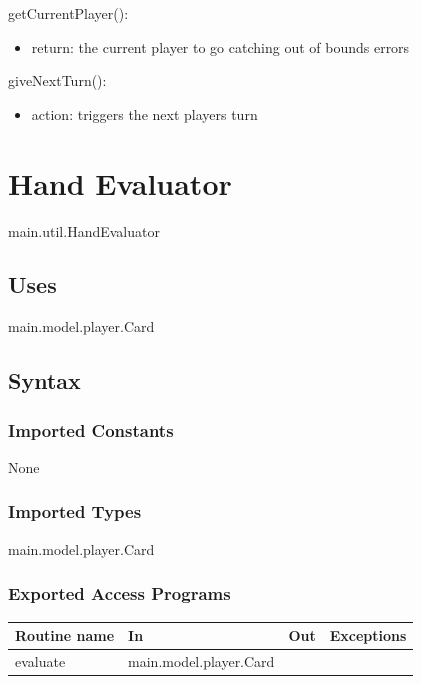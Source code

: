 \documentclass[12pt, titlepage]{article}
\begin{document}
\noindent getCurrentPlayer():
\begin{itemize}
    \item return: the current player to go
    \exception catching out of bounds errors
\end{itemize}

\noindent giveNextTurn():
\begin{itemize}
    \item action: triggers the next players turn
\end{itemize}



\section*{Hand Evaluator}

main.util.HandEvaluator

\subsection* {Uses}

main.model.player.Card

\subsection* {Syntax}

\subsubsection* {Imported Constants}

None

\subsubsection* {Imported Types}

main.model.player.Card

\subsubsection* {Exported Access Programs}

\begin{tabular}{| l | l | l | p{5cm} |}
\hline
\textbf{Routine name} & \textbf{In} & \textbf{Out} & \textbf{Exceptions}\\
\hline
evaluate & main.model.player.Card & &\\
\hline
\end{tabular}
\end{document}

